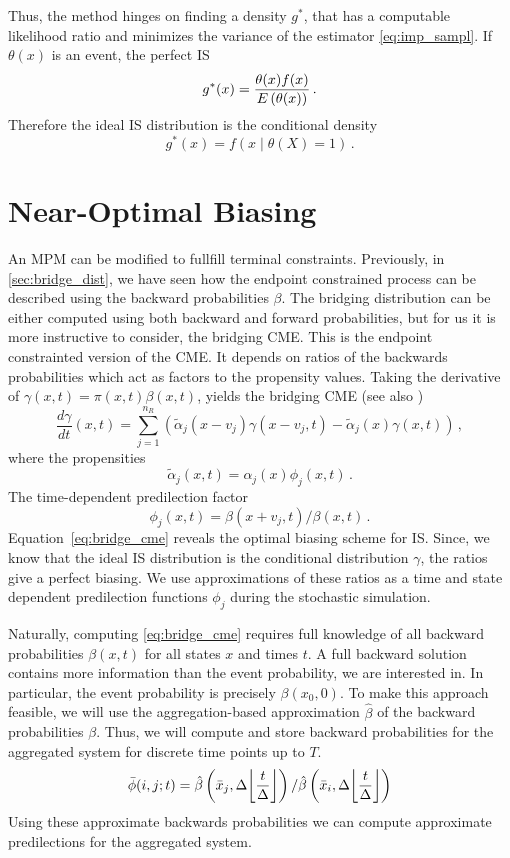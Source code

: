 Thus, the method hinges on finding a density $g^{*}$, that has a computable likelihood ratio and  minimizes the variance of the estimator \eqref{eq:imp_sampl}.
If $\theta(x)$ is an event, the perfect \ac{IS} \parencite[Chapter~9.7.1]{kroese2013handbook}
\[
    g^*(x) = \frac{\theta(x) f(x)}{{E}\left(\theta(x)\right)}\,.
\]
Therefore the ideal \ac{IS} distribution is the conditional density
\[
    g^*(x) = f(x \mid \theta(X) = 1)\,.
\]

\section{Near-Optimal Biasing}
An \ac{MPM} can be modified to fullfill terminal constraints.
Previously, in \autoref{sec:bridge_dist}, we have seen how the endpoint constrained process can be described using the backward probabilities $\beta$.
The bridging distribution can be either computed using both backward and forward probabilities, but for us it is more instructive to consider, the bridging \ac{CME}.
This is the endpoint constrainted version of the \ac{CME}.
It depends on ratios of the backwards probabilities which act as factors to the propensity values.
Taking the derivative of $\gamma(x,t)=\pi(x,t)\beta(x,t)$, yields the bridging \ac{CME} (see also \citet{huang2016reconstructing})
\begin{equation}\label{eq:bridge_cme}
    \frac{d\gamma}{d t} ( x,t) =
    \sum_{j=1}^{n_R}\left(
        \tilde{\alpha}_j( x- v_j)\gamma( x- v_j,t) - \tilde{\alpha}_j( x)\gamma( x,t)
    \right)\,,
\end{equation}
where the propensities
\begin{equation}
    \tilde{\alpha}_j(x, t) = \alpha_j(x)\phi_j(x, t)\,.
\end{equation}
The time-dependent predilection factor
\begin{equation}\label{eq:dyn_predilection}
    \phi_j(x, t) = {\beta(x + v_j, t)}/{\beta(x, t)}\,.
\end{equation}
Equation~\eqref{eq:bridge_cme} reveals the optimal biasing scheme for \ac{IS}.
Since, we know that the ideal \ac{IS} distribution is the conditional distribution $\gamma$, the ratios
give a perfect biasing.
We use approximations of these ratios as a time and state dependent predilection functions $\phi_j$ during the stochastic simulation.

Naturally, computing \eqref{eq:bridge_cme} requires full knowledge of all backward probabilities $\beta(x, t)$ for all states $x$ and times $t$.
A full backward solution contains more information than the event probability, we are interested in.
In particular, the event probability is precisely $\beta(x_0, 0)$.
To make this approach feasible, we will use the aggregation-based approximation $\hat{\beta}$ of the backward probabilities $\beta$.
Thus, we will compute and store backward probabilities for the aggregated system for discrete time points up to $T$.
\[
    \bar{\phi}(i, j; t) = \hat{\beta}\left(\bar{x}_j, \Delta\floor*{\frac{t}{\Delta}}\right) / \hat{\beta}\left(\bar{x}_i, \Delta\floor*{\frac{t}{\Delta}}\right)
\]
Using these approximate backwards probabilities we can compute approximate predilections for the aggregated system.


